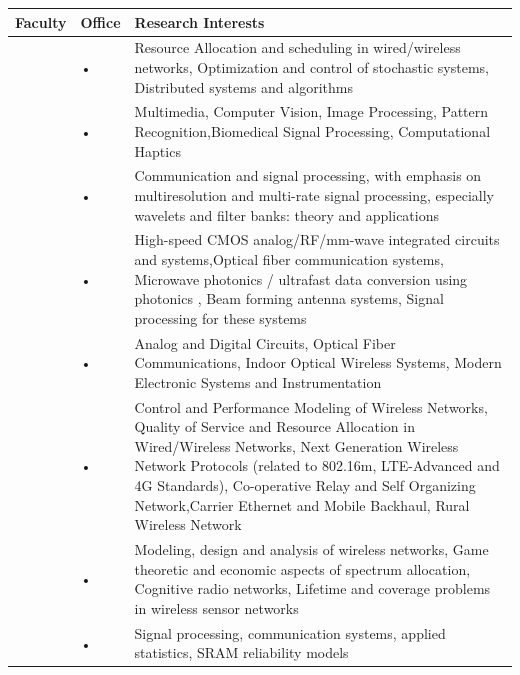 \documentclass[openany]{book} %
\begin{document}
\begin{tabular}{p{3.5cm} p{3.5cm}p{9cm}}
\hline 
\hline 
Faculty  & Office  & Research Interests \\ 
\hline

\href{https://www.ee.iitb.ac.in/wiki/faculty/chaporkar}{\color{blue}{Prof. Prasanna Chaporkar }} & • & Resource Allocation and scheduling in wired/wireless networks, Optimization and control of stochastic systems, Distributed systems and algorithms \\ 
\hline 
\href{https://www.ee.iitb.ac.in/~sc/}{\color{blue}{Prof. Subhasis Chaudhuri}} & • & Multimedia, Computer Vision, Image Processing, Pattern Recognition,Biomedical Signal Processing, Computational Haptics \\ 
\hline 
\href{https://www.ee.iitb.ac.in/wiki/faculty/vmgadre}{\color{blue}{Prof. Vikram M. Gadre }}& • & Communication and signal processing, with emphasis on multiresolution
and multi-rate signal processing, especially wavelets and filter banks:
theory and applications \\ 
\hline 
\href{https://www.ee.iitb.ac.in/wiki/faculty/shalabh}{\color{blue}{Prof. Shalabh Gupta}} & • & High-speed CMOS analog/RF/mm-wave integrated circuits and systems,Optical fiber communication systems, Microwave photonics / ultrafast data  conversion using photonics , Beam forming antenna systems, Signal processing for these systems \\ 
\hline 
\href{https://www.ee.iitb.ac.in/wiki/faculty/jjohn}{\color{blue}{Prof. Joseph John}} & • & Analog and Digital Circuits, Optical Fiber Communications, Indoor Optical Wireless Systems, Modern Electronic Systems and Instrumentation \\ 
\hline 
\href{http://www.iitb.ac.in/en/employee/prof-abhay-karandikar}{\color{blue}{Prof. Abhay Karandikar }}& • & Control and Performance Modeling of Wireless Networks, Quality of Service and Resource Allocation in Wired/Wireless Networks, Next Generation Wireless Network Protocols (related to 802.16m, LTE-Advanced and 4G Standards), Co-operative Relay and Self Organizing Network,Carrier Ethernet and Mobile Backhaul, Rural Wireless Network \\ 
\hline 
\href{https://www.ee.iitb.ac.in/~gskasbekar/}{\color{blue}{Prof. Gaurav S. Kasbekar}}& • & Modeling, design and analysis of wireless networks, Game theoretic and economic aspects of spectrum allocation, Cognitive radio networks,
Lifetime and coverage problems in wireless sensor networks \\ 
\hline 
\href{https://www.ee.iitb.ac.in/~animesh/}{\color{blue}{Prof. Animesh Kumar }} & • & Signal processing, communication systems, applied statistics, SRAM reliability models \\ 
\hline 
\end{tabular} 
\end{document}
